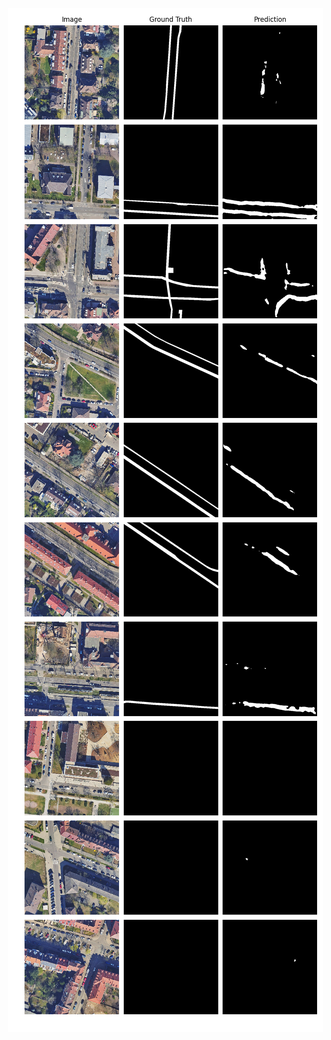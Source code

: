 	\begin{figure}
	\centering
	\begin{subfigure}{.4\textwidth}
		\centering
		\includegraphics[width=1.\textwidth]{Bilder/Samples-KA/dbunet-s.png} 

\end{subfigure}
\end{figure}
